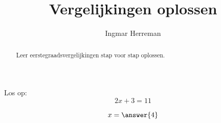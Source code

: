 \documentclass{ximera}
\title{Vergelijkingen oplossen}
\author{Ingmar Herreman}
\begin{document}
\begin{abstract}
Leer eerstegraadsvergelijkingen stap voor stap oplossen.
\end{abstract}

\maketitle

\begin{exercise}
    Los op:
    \[
        2x+3=11
    \]

    \[
        x=\answer{4}
    \]
\end{exercise}
\end{document}

